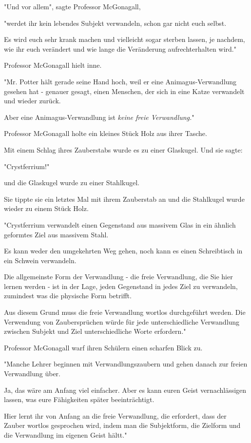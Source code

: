 {"Und vor allem", sagte Professor McGonagall,

"werdet ihr kein lebendes Subjekt verwandeln, schon gar nicht euch selbst.

Es wird euch sehr krank machen und vielleicht sogar sterben lassen, je nachdem, wie ihr euch verändert und wie lange die Veränderung aufrechterhalten wird."

Professor McGonagall hielt inne.

"Mr. Potter hält gerade seine Hand hoch, weil er eine Animagus-Verwandlung gesehen hat - genauer gesagt, einen Menschen, der sich in eine Katze verwandelt und wieder zurück.

Aber eine Animagus-Verwandlung ist \emph{keine freie Verwandlung.}"

Professor McGonagall holte ein kleines Stück Holz aus ihrer Tasche.

Mit einem Schlag ihres Zauberstabs wurde es zu einer Glaskugel. Und sie sagte:

"Crystferrium!"

und die Glaskugel wurde zu einer Stahlkugel.

Sie tippte sie ein letztes Mal mit ihrem Zauberstab an und die Stahlkugel wurde wieder zu einem Stück Holz.

"Crystferrium verwandelt einen Gegenstand aus massivem Glas in ein ähnlich geformtes Ziel aus massivem Stahl.

Es kann weder den umgekehrten Weg gehen, noch kann es einen Schreibtisch in ein Schwein verwandeln.

Die allgemeinste Form der Verwandlung - die freie Verwandlung, die Sie hier lernen werden - ist in der Lage, jeden Gegenstand in jedes Ziel zu verwandeln, zumindest was die physische Form betrifft.

Aus diesem Grund muss die freie Verwandlung wortlos durchgeführt werden. Die Verwendung von Zaubersprüchen würde für jede unterschiedliche Verwandlung zwischen Subjekt und Ziel unterschiedliche Worte erfordern."

Professor McGonagall warf ihren Schülern einen scharfen Blick zu.

"Manche Lehrer beginnen mit Verwandlungszaubern und gehen danach zur freien Verwandlung über.

Ja, das wäre am Anfang viel einfacher. Aber es kann euren Geist vernachlässigen lassen, was eure Fähigkeiten später beeinträchtigt.

Hier lernt ihr von Anfang an die freie Verwandlung, die erfordert, dass der Zauber wortlos gesprochen wird, indem man die Subjektform, die Zielform und die Verwandlung im eigenen Geist hältt."

}
